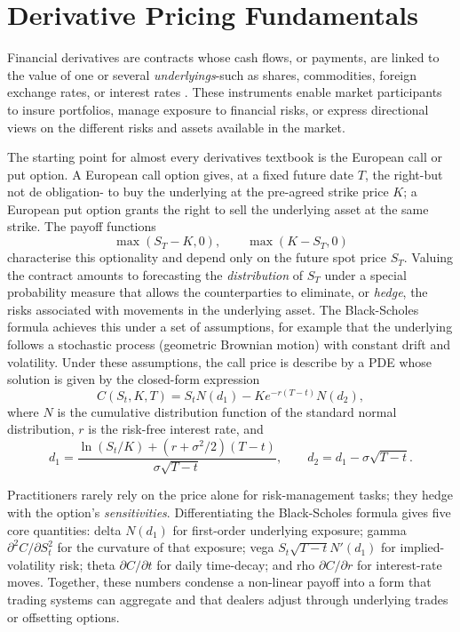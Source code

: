 \documentclass[12pt]{report} %
\theoremstyle{plain} %
\theoremstyle{definition} %
\theoremstyle{remark} %
\begin{document}
\section{Derivative Pricing Fundamentals}\label{sec:derivatives_overview}

Financial derivatives are contracts whose cash flows, or payments, are linked to the value of one
or several \emph{underlyings}-such as shares, commodities, foreign exchange rates, or interest
rates \cite{alma99148840908702021,Wilmott2010PaulWO}. These instruments enable market participants
to insure portfolios, manage exposure to financial risks, or express directional views on the different risks 
and assets available in the market.

The starting point for almost every derivatives textbook is the European call or put option. A
European call option gives, at a fixed future date \(T\), the right-but not de obligation- to buy the underlying at the
pre-agreed strike price \(K\); a European put option grants the right to sell the underlying asset
at the same strike. The payoff functions
\[
\max(S_T-K,0),\qquad \max(K-S_T,0)
\]
characterise this optionality and depend only on the future spot price \(S_T\). Valuing the
contract amounts to forecasting the \emph{distribution} of \(S_T\) under a special probability
measure that allows the counterparties to eliminate, or \emph{hedge}, the risks associated with
movements in the underlying asset. The Black-Scholes formula achieves this under a set of
assumptions, for example that the underlying follows a stochastic process (geometric Brownian motion) with constant
drift and volatility. Under these assumptions, the call price is describe by a PDE whose solution is given by the closed-form
expression
\[
C(S_t,K,T)=S_t N(d_1)-K e^{-r(T-t)} N(d_2),
\]
where \(N\) is the cumulative distribution function of the standard normal distribution, \(r\) is
the risk-free interest rate, and
\[
d_1=\frac{\ln(S_t/K)+(r+\sigma^2/2)(T-t)}{\sigma\sqrt{T-t}},\qquad
d_2=d_1-\sigma\sqrt{T-t}.
\]

Practitioners rarely rely on the price alone for risk-management tasks; they hedge with the option's
\emph{sensitivities}. Differentiating the Black-Scholes formula gives five core
quantities: delta \(N(d_1)\) for first-order underlying exposure; gamma
\(\partial^2 C/\partial S_t^2\) for the curvature of that exposure; vega
\(S_t\sqrt{T-t}N'(d_1)\) for implied-volatility risk; theta
\(\partial C/\partial t\) for daily time-decay; and rho
\(\partial C/\partial r\) for interest-rate moves. Together, these numbers condense a
non-linear payoff into a form that trading systems can aggregate and that dealers adjust
through underlying trades or offsetting options.
\end{document}

